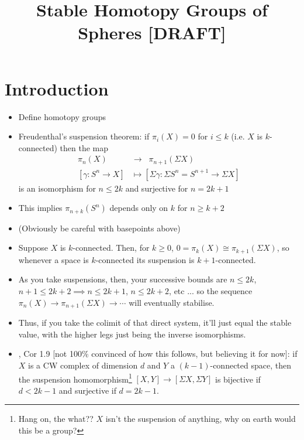 \documentclass{MetricNotes2023}
\author{\vspace{-5ex}}
\title{Stable Homotopy Groups of Spheres  [DRAFT]}
\date{\vspace{-5ex}}
\begin{document}
\maketitle
%

\DeclarePairedDelimiter{\norm}{\lVert}{\rVert} 
\DeclarePairedDelimiter{\abs}{\lvert}{\rvert} 
\DeclarePairedDelimiter{\ang}{\langle}{\rangle} 

\tableofcontents

\pagebreak

\section{Introduction}

\begin{itemize}
\item Define homotopy groups
\item Freudenthal's suspension theorem: if \(\pi_i(X)=0\) for \(i\leq k\) (i.e. \(X\) is \(k\)-connected) then the map 
\begin{align*}
\pi_n(X) \;\;&\to\;\; \pi_{n+1}(\Sigma X)\\
[\gamma : S^n \to X] &\mapsto [\Sigma \gamma : \Sigma S^n=S^{n+1} \to \Sigma X]
\end{align*}
is an isomorphism for \(n \leq 2k\) and surjective for \(n=2k+1\)
\item This implies \(\pi_{n+k}(S^n)\) depends only on \(k\) for \(n\geq k+2\)
\item (Obviously be careful with basepoints above)
\item Suppose \(X\) is \(k\)-connected. Then, for \(k\geq 0\), \(0=\pi_k(X)\cong \pi_{k+1}(\Sigma X)\), so whenever a space is \(k\)-connected its suspension is \(k+1\)-connected. 
\item As you take suspensions, then, your successive bounds are \(n \leq 2k\), \(n+1\leq 2k+2\implies n \leq 2k+1\), \(n\leq 2k+2\), etc ... so the sequence \(\pi_n(X)\to \pi_{n+1}(\Sigma X)\to \cdots\) will eventually stabilise.  
\item Thus, if you take the colimit of that direct system, it'll just equal the stable value, with the higher legs just being the inverse isomorphisms.
\item \autocite{ass}, Cor 1.9 [not 100\% convinced of how this follows, but believing it for now]: if \(X\) is a CW complex of dimension \(d\) and \(Y\) a \((k-1)\)-connected space, then the suspension homomorphism\footnote{Hang on, the what?? \(X\) isn't the suspension of anything, why on earth would this be a group?} \([X, Y]\to[\Sigma X, \Sigma Y]\) is bijective if \(d<2k-1\) and surjective if \(d=2k-1\). 
\end{itemize}
\end{document}
